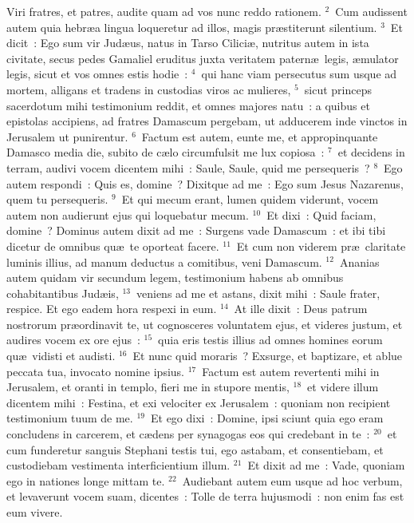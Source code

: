 \lettrine[lines=3,image=true,loversize=0.05,lraise=-0.03]{V}{}iri fratres, et patres, audite quam ad vos nunc reddo rationem.
${}^{2}$~Cum audissent autem quia hebr\ae a lingua loqueretur ad illos, magis pr\ae stiterunt silentium.
${}^{3}$~Et dicit~: Ego sum vir Jud\ae us, natus in Tarso Cilici\ae , nutritus autem in ista civitate, secus pedes Gamaliel eruditus juxta veritatem patern\ae\ legis, \ae mulator legis, sicut et vos omnes estis hodie~:
${}^{4}$~qui hanc viam persecutus sum usque ad mortem, alligans et tradens in custodias viros ac mulieres,
${}^{5}$~sicut princeps sacerdotum mihi testimonium reddit, et omnes majores natu~: a quibus et epistolas accipiens, ad fratres Damascum pergebam, ut adducerem inde vinctos in Jerusalem ut punirentur.
${}^{6}$~Factum est autem, eunte me, et appropinquante Damasco media die, subito de c\ae lo circumfulsit me lux copiosa~:
${}^{7}$~et decidens in terram, audivi vocem dicentem mihi~: Saule, Saule, quid me persequeris~?
${}^{8}$~Ego autem respondi~: Quis es, domine~? Dixitque ad me~: Ego sum Jesus Nazarenus, quem tu persequeris.
${}^{9}$~Et qui mecum erant, lumen quidem viderunt, vocem autem non audierunt ejus qui loquebatur mecum.
${}^{10}$~Et dixi~: Quid faciam, domine~? Dominus autem dixit ad me~: Surgens vade Damascum~: et ibi tibi dicetur de omnibus qu\ae\ te oporteat facere.
${}^{11}$~Et cum non viderem pr\ae\ claritate luminis illius, ad manum deductus a comitibus, veni Damascum.
${}^{12}$~Ananias autem quidam vir secundum legem, testimonium habens ab omnibus cohabitantibus Jud\ae is,
${}^{13}$~veniens ad me et astans, dixit mihi~: Saule frater, respice. Et ego eadem hora respexi in eum.
${}^{14}$~At ille dixit~: Deus patrum nostrorum pr\ae ordinavit te, ut cognosceres voluntatem ejus, et videres justum, et audires vocem ex ore ejus~:
${}^{15}$~quia eris testis illius ad omnes homines eorum qu\ae\ vidisti et audisti.
${}^{16}$~Et nunc quid moraris~? Exsurge, et baptizare, et ablue peccata tua, invocato nomine ipsius.
${}^{17}$~Factum est autem revertenti mihi in Jerusalem, et oranti in templo, fieri me in stupore mentis,
${}^{18}$~et videre illum dicentem mihi~: Festina, et exi velociter ex Jerusalem~: quoniam non recipient testimonium tuum de me.
${}^{19}$~Et ego dixi~: Domine, ipsi sciunt quia ego eram concludens in carcerem, et c\ae dens per synagogas eos qui credebant in te~:
${}^{20}$~et cum funderetur sanguis Stephani testis tui, ego astabam, et consentiebam, et custodiebam vestimenta interficientium illum.
${}^{21}$~Et dixit ad me~: Vade, quoniam ego in nationes longe mittam te.
${}^{22}$~Audiebant autem eum usque ad hoc verbum, et levaverunt vocem suam, dicentes~: Tolle de terra hujusmodi~: non enim fas est eum vivere.


